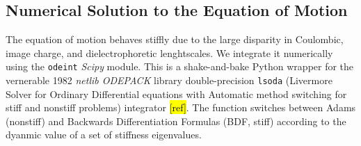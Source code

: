 \documentclass[10pt,a4paper]{article}
\begin{document}
\subsection*{Numerical Solution to the Equation of Motion}
The equation of motion behaves stiffly due to the large disparity in Coulombic, image charge, and dielectrophoretic lenghtscales. We integrate it numerically using the \verb|odeint| \emph{Scipy} module. This is a shake-and-bake Python wrapper for the vernerable 1982 \emph{netlib ODEPACK} library double-precision \verb|lsoda| (Livermore Solver for Ordinary Differential equations with Automatic method switching for stiff and nonstiff problems) integrator \hl{[ref]}. The function switches between Adams (nonstiff) and Backwards Differentiation Formulas (BDF, stiff) according to the dyanmic value of a set of stiffness eigenvalues.
\end{document}
